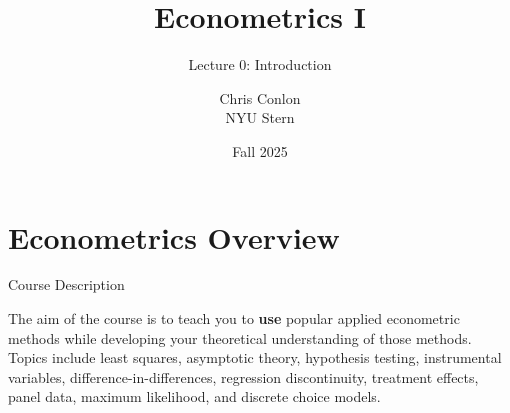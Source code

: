 
















\title[L0 - Introduction]{ Econometrics I}
\subtitle{Lecture 0: Introduction}
\author{Chris Conlon \\NYU Stern}
\date{Fall 2025}
\maketitle

\section{Econometrics Overview}


\begin{frame}{Course Description}

\parbox{\linewidth}{
The aim of the course is to teach you to {\bf use} popular
applied econometric methods while developing your theoretical understanding
of those methods. Topics include least squares, asymptotic theory,
hypothesis testing, instrumental variables, difference-in-differences,
regression discontinuity, treatment effects, panel data, maximum likelihood, and
discrete choice models.
}

\end{frame}


